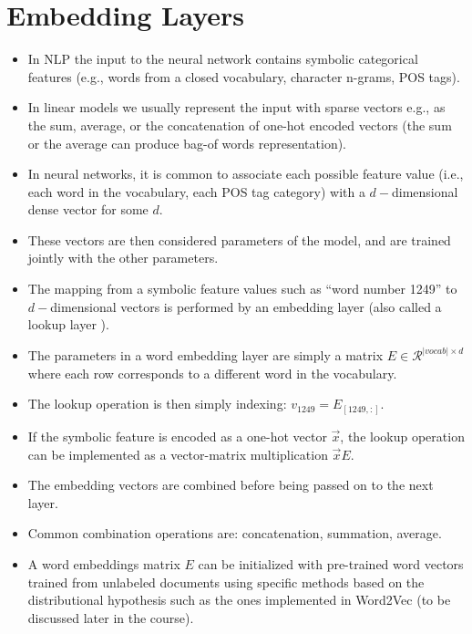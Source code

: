 \section{Embedding Layers}
\begin{itemize}
\item In NLP the input to the neural network contains symbolic categorical features (e.g., words from a closed vocabulary, character n-grams, POS tags).

\item In linear models we usually represent the input with sparse vectors e.g., as the sum, average,  or the concatenation of one-hot encoded vectors (the sum or the average can produce bag-of words representation). 

\item In neural networks, it is common to associate each possible feature value (i.e., each word in the vocabulary, each POS tag category) with a $d-$dimensional dense vector for some $d$.

\item These vectors are then considered parameters of the model, and are trained jointly with the other parameters.

\item The mapping from a symbolic feature values such as ``word number 1249'' to $d-$dimensional vectors is performed by an embedding layer (also called a lookup layer ).

\item The parameters in a word embedding layer are simply a matrix $E \in \mathcal{R}^{|vocab|\times d}$ where each row corresponds to a different word in the vocabulary.

\item The lookup operation is then simply indexing: $v_{1249} = E_{[1249,:]}$.

\item If the symbolic feature is encoded as a one-hot vector $\vec{x}$, the lookup operation can be implemented as a vector-matrix multiplication $\vec{x}E$.

\item The embedding vectors are combined before being passed on to the next layer.

\item Common combination operations are: concatenation, summation, average. 

\item A word embeddings matrix $E$ can be initialized with pre-trained word vectors trained from unlabeled documents using specific methods based on the distributional hypothesis such as the ones implemented in Word2Vec (to be discussed later in the course).


\end{itemize}




